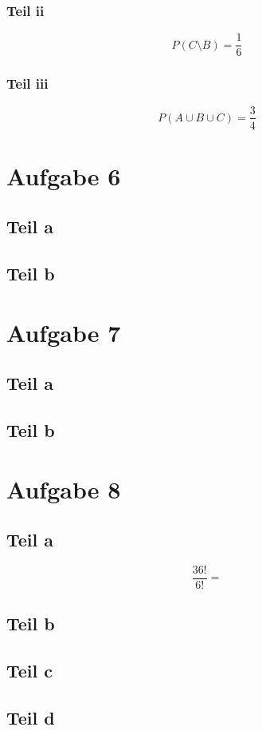 \documentclass[10pt,a4paper]{article}
\begin{document}
\subsubsection{Teil ii}
\begin{equation}
  P(C \setminus B) = \frac{1}{6}
\end{equation}

\subsubsection{Teil iii}
\begin{equation}
  P(A \cup B \cup C) = \frac{3}{4}
\end{equation}

\section{Aufgabe 6}

\subsection{Teil a}

\subsection{Teil b}

\section{Aufgabe 7}

\subsection{Teil a}

\subsection{Teil b}

\section{Aufgabe 8}

\subsection{Teil a}
\begin{equation}
  \frac{36!}{6!} = 
\end{equation}

\subsection{Teil b}

\subsection{Teil c}

\subsection{Teil d}
\end{document}
